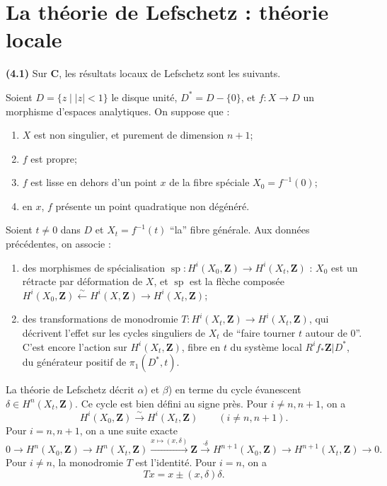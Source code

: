 \documentclass[12pt,a4paper]{amsart}
\theoremstyle{plain}
\theoremstyle{definition}
\theoremstyle{remark}
\newcommand{\Z}{\mathbf{Z}}
\newcommand{\C}{\mathbf{C}}
\numberwithin{equation}{section}
\begin{document}
\section{La th\'eorie de Lefschetz : th\'eorie locale}

\noindent \textbf{(4.1)} Sur $\C$, les r\'esultats locaux de Lefschetz sont les suivants.

Soient $D=\{z\mid |z|<1\}$ le disque unit\'e, $D^\ast=D-\{0\}$, et $f:X\to D$ un morphisme d'espaces analytiques. On suppose que :
\begin{enumerate}
\item[a)] $X$ est non singulier, et purement de dimension $n+1$;
\item[b)] $f$ est propre;
\item[c)] $f$ est lisse en dehors d'un point $x$ de la fibre sp\'eciale $X_0=f^{-1}(0)$;
\item[d)] en $x$, $f$ pr\'esente un point quadratique non d\'eg\'en\'er\'e.
\end{enumerate}

Soient $t\not=0$ dans $D$ et $X_t=f^{-1}(t)$ ``la'' fibre g\'en\'erale. Aux donn\'ees pr\'ec\'edentes, on associe :

\begin{enumerate}
\item[$\alpha$)] des morphismes de sp\'ecialisation $\operatorname{sp}:H^i(X_0,\Z)\to H^i(X_t,\Z)$ : $X_0$ est un r\'etracte par d\'eformation de $X$, et $\operatorname{sp}$ est la fl\`eche compos\'ee $H^i(X_0,\Z)\xleftarrow{\sim} H^i(X,\Z)\to H^i(X_t,\Z)$;
\item[$\beta$)] des transformations de monodromie $T:H^i(X_t,\Z)\to H^i(X_t,\Z)$, qui d\'ecrivent l'effet sur les cycles singuliers de $X_t$ de ``faire tourner $t$ autour de $0$''. C'est encore l'action sur $H^i(X_t,\Z)$, fibre en $t$ du syst\`eme local $R^i f_\ast\Z|D^\ast$, du g\'en\'erateur positif de $\pi_1(D^\ast,t)$.
\end{enumerate}

La th\'eorie de Lefschetz d\'ecrit $\alpha$) et $\beta$) en terme du cycle \'evanescent $\delta\in H^n(X_t,\Z)$. Ce cycle est bien d\'efini au signe pr\`es. Pour $i\not=n,n+1$, on a
\[
H^i(X_0,\Z) \xrightarrow{\sim} H^i(X_t,\Z) \qquad (i\not=n,n+1).
\]
Pour $i=n,n+1$, on a une suite exacte
\[
0 \longrightarrow H^n(X_0,\Z) \longrightarrow H^n(X_t,\Z) \xrightarrow{x\mapsto(x,\delta)} \Z \xrightarrow{\cdot\delta} H^{n+1}(X_0,\Z) \longrightarrow H^{n+1}(X_t,\Z) \longrightarrow 0.
\]
Pour $i\not=n$, la monodromie $T$ est l'identit\'e. Pour $i=n$, on a
\[
Tx = x \pm (x,\delta)\delta.
\]
\end{document}
